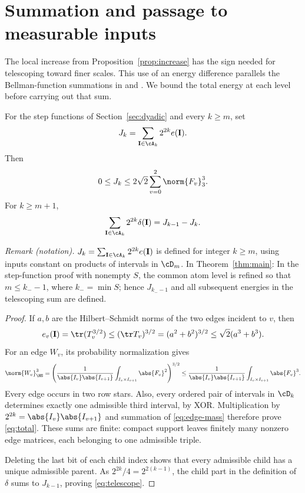 \section{Summation and passage to measurable inputs}\label{sec:summation}

The local increase from Proposition~\ref{prop:increase} has the sign
needed for telescoping toward finer scales. This use of an energy
difference parallels the Bellman-function summations in
\cite[Section~2]{Kovac2011} and \cite[Lemma~2]{Kovac2012}.
We bound the total energy at each level before carrying out that sum.

\begin{lemma}\label{lem:total}
For the step functions of Section~\ref{sec:dyadic} and every \(k\ge m\),
set
\[
 J_k=\sum_{\mathbf I\in\cA_k}2^{2k}e(\mathbf I).
\]
Then
\begin{equation}\label{eq:total}
 0\le J_k\le2\sqrt2\sum_{v=0}^2\norm{F_v}_3^3.
\end{equation}
For \(k\ge m+1\),
\begin{equation}\label{eq:telescope}
 \sum_{\mathbf I\in\cA_k}2^{2k}\delta(\mathbf I)
       =J_{k-1}-J_k.
\end{equation}
\end{lemma}

\noindent\textit{Remark (notation).} $J_k=\sum_{\mathbf I\in\cA_k}2^{2k}e(\mathbf I)$ is defined for integer $k\ge m$, using inputs constant on products of intervals in $\cD_m$. In Theorem~\ref{thm:main}: In the step-function proof with nonempty $S$, the common atom level is refined so that $m\le k_--1$, where $k_-=\min S$; hence $J_{k_--1}$ and all subsequent energies in the telescoping sum are defined.


\begin{proof}
If \(a,b\) are the Hilbert--Schmidt norms of the two edges incident
to \(v\), then
\[
 e_v(\mathbf I)
 =\tr(T_v^{3/2})
 \le(\tr T_v)^{3/2}
 =(a^2+b^2)^{3/2}
 \le\sqrt2(a^3+b^3).
\]
For an edge \(W_v\), its probability normalization gives
\begin{equation}\label{eq:edge-mass}
 \norm{W_v}_{\HS}^3
 =\left(\frac1{\abs{I_v}\abs{I_{v+1}}}
          \int_{I_v\times I_{v+1}}\abs{F_v}^2\right)^{3/2}
 \le \frac1{\abs{I_v}\abs{I_{v+1}}}
          \int_{I_v\times I_{v+1}}\abs{F_v}^3.
\end{equation}
Every edge occurs in two row stars. Also, every ordered pair of
intervals in \(\cD_k\) determines exactly one admissible third
interval, by XOR. Multiplication by \(2^{2k}=\abs{I_v}\abs{I_{v+1}}\)
and summation of \eqref{eq:edge-mass} therefore prove \eqref{eq:total}.
These sums are finite: compact support leaves finitely many nonzero
edge matrices, each belonging to one admissible triple.

Deleting the last bit of each child index shows that every admissible
child has a unique admissible parent. As
\(2^{2k}/4=2^{2(k-1)}\), the child part in the definition of
\(\delta\) sums to \(J_{k-1}\), proving \eqref{eq:telescope}.
\end{proof}

